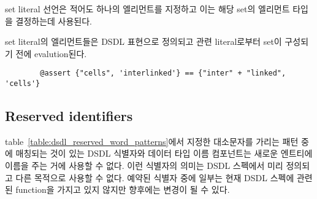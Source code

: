set literal 선언은 적어도 하나의 엘리먼트를 지정하고 이는 해당 set의 엘리먼트 타입을 결정하는데 사용된다.

set literal의 엘리먼트들은 DSDL 표현으로 정의되고 관련 literal로부터 set이 구성되기 전에 evalution된다.

\begin{remark}
    \begin{verbatim}
        @assert {"cells", 'interlinked'} == {"inter" + "linked", 'cells'}
    \end{verbatim}
\end{remark}

\subsection{Reserved identifiers}\label{sec:dsdl_reserved_identifiers}

table~\ref{table:dsdl_reserved_word_patterns}에서 지정한 대소문자를 가리는 패턴 중에 매칭되는 것이 있는 DSDL 식별자와 데이터 타입 이름 컴포넌트는 새로운 엔트티에 이름을 주는 거에 사용할 수 없다.
이런 식별자의 의미는 DSDL 스펙에서 미리 정의되고 다른 목적으로 사용할 수 없다.
예약된 식별자 중에 일부는 현재 DSDL 스펙에 관련된 function을 가지고 있지 않지만 향후에는 변경이 될 수 있다.

